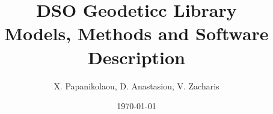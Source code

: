 \documentclass[12pt, a4paper, twoside]{article}
\begin{document}
\showthe\textwidth

\title{%
  DSO Geodeticc Library \\
  \large Models, Methods and Software Description}
\author{X. Papanikolaou, D. Anastasiou, V. Zacharis}
\date{\today}

\maketitle
\clearpage

\tableofcontents
\clearpage
\listoffigures
\clearpage
\listoftables
\clearpage







\clearpage
\printnomenclature
\clearpage
\printglossary[type=\acronymtype,title=Acronyms]
\clearpage
{}

\clearpage
\printbibliography
\end{document}
